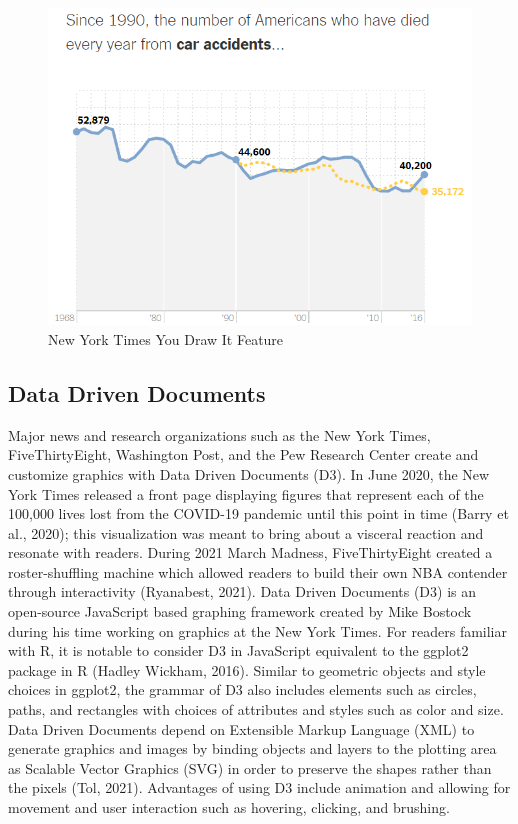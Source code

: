 \documentclass[print]{nuthesis}
\begin{document}
\begin{figure}[tbp]

{\centering \includegraphics[width=0.75\linewidth,]{images/nyt-caraccidents-frame4} 

}

\caption{New York Times You Draw It Feature}\label{fig:nyt-caraccidents}
\end{figure}

\hypertarget{data-driven-documents}{%
\subsection{Data Driven Documents}\label{data-driven-documents}}

Major news and research organizations such as the New York Times, FiveThirtyEight, Washington Post, and the Pew Research Center create and customize graphics with Data Driven Documents (D3).
In June 2020, the New York Times released a front page displaying figures that represent each of the 100,000 lives lost from the COVID-19 pandemic until this point in time (Barry et al., 2020); this visualization was meant to bring about a visceral reaction and resonate with readers.
During 2021 March Madness, FiveThirtyEight created a roster-shuffling machine which allowed readers to build their own NBA contender through interactivity (Ryanabest, 2021).
Data Driven Documents (D3) is an open-source JavaScript based graphing framework created by Mike Bostock during his time working on graphics at the New York Times.
For readers familiar with R, it is notable to consider D3 in JavaScript equivalent to the ggplot2 package in R (Hadley Wickham, 2016).
Similar to geometric objects and style choices in ggplot2, the grammar of D3 also includes elements such as circles, paths, and rectangles with choices of attributes and styles such as color and size.
Data Driven Documents depend on Extensible Markup Language (XML) to generate graphics and images by binding objects and layers to the plotting area as Scalable Vector Graphics (SVG) in order to preserve the shapes rather than the pixels  (Tol, 2021).
Advantages of using D3 include animation and allowing for movement and user interaction such as hovering, clicking, and brushing.
\end{document}
